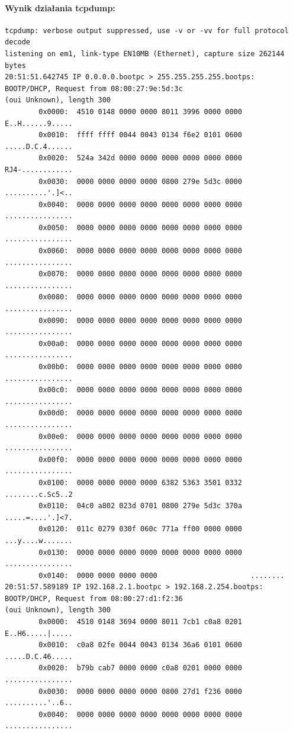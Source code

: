 \documentclass{mwart} %
\begin{document}
\paragraph{Wynik działania tcpdump:}
\begin{footnotesize}
\begin{verbatim}
tcpdump: verbose output suppressed, use -v or -vv for full protocol decode
listening on em1, link-type EN10MB (Ethernet), capture size 262144 bytes
20:51:51.642745 IP 0.0.0.0.bootpc > 255.255.255.255.bootps: BOOTP/DHCP, Request from 08:00:27:9e:5d:3c
(oui Unknown), length 300
        0x0000:  4510 0148 0000 0000 8011 3996 0000 0000  E..H......9.....
        0x0010:  ffff ffff 0044 0043 0134 f6e2 0101 0600  .....D.C.4......
        0x0020:  524a 342d 0000 0000 0000 0000 0000 0000  RJ4-............
        0x0030:  0000 0000 0000 0000 0800 279e 5d3c 0000  ..........'.]<..
        0x0040:  0000 0000 0000 0000 0000 0000 0000 0000  ................
        0x0050:  0000 0000 0000 0000 0000 0000 0000 0000  ................
        0x0060:  0000 0000 0000 0000 0000 0000 0000 0000  ................
        0x0070:  0000 0000 0000 0000 0000 0000 0000 0000  ................
        0x0080:  0000 0000 0000 0000 0000 0000 0000 0000  ................
        0x0090:  0000 0000 0000 0000 0000 0000 0000 0000  ................
        0x00a0:  0000 0000 0000 0000 0000 0000 0000 0000  ................
        0x00b0:  0000 0000 0000 0000 0000 0000 0000 0000  ................
        0x00c0:  0000 0000 0000 0000 0000 0000 0000 0000  ................
        0x00d0:  0000 0000 0000 0000 0000 0000 0000 0000  ................
        0x00e0:  0000 0000 0000 0000 0000 0000 0000 0000  ................
        0x00f0:  0000 0000 0000 0000 0000 0000 0000 0000  ................
        0x0100:  0000 0000 0000 0000 6382 5363 3501 0332  ........c.Sc5..2
        0x0110:  04c0 a802 023d 0701 0800 279e 5d3c 370a  .....=....'.]<7.
        0x0120:  011c 0279 030f 060c 771a ff00 0000 0000  ...y....w.......
        0x0130:  0000 0000 0000 0000 0000 0000 0000 0000  ................
        0x0140:  0000 0000 0000 0000                      ........
20:51:57.589189 IP 192.168.2.1.bootpc > 192.168.2.254.bootps: BOOTP/DHCP, Request from 08:00:27:d1:f2:36 
(oui Unknown), length 300
        0x0000:  4510 0148 3694 0000 8011 7cb1 c0a8 0201  E..H6.....|.....
        0x0010:  c0a8 02fe 0044 0043 0134 36a6 0101 0600  .....D.C.46.....
        0x0020:  b79b cab7 0000 0000 c0a8 0201 0000 0000  ................
        0x0030:  0000 0000 0000 0000 0800 27d1 f236 0000  ..........'..6..
        0x0040:  0000 0000 0000 0000 0000 0000 0000 0000  ................

\end{verbatim}
\end{footnotesize}
\end{document}
